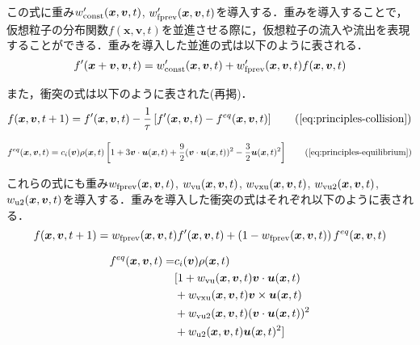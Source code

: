 この式に重み$w'_{\rm{const}}(\bm{x}, \bm{v}, t)$, $w'_{\rm{fprev}}(\bm{x}, \bm{v}, t)$を導入する．重みを導入することで，仮想粒子の分布関数$f(\bm{x}, \bm{v}, t)$を並進させる際に，仮想粒子の流入や流出を表現することができる．重みを導入した並進の式は以下のように表される．
\begin{equation}
  f'(\bm{x}+\bm{v}, \bm{v}, t) = 
  w'_{\rm{const}}(\bm{x}, \bm{v}, t) + 
  w'_{\rm{fprev}}(\bm{x}, \bm{v}, t) f(\bm{x}, \bm{v}, t) 
  \label{eq:weighted-streaming}
\end{equation}

また，衝突の式は以下のように表された(再掲)．
\begin{equation}
  f(\bm{x}, \bm{v}, t+1) = 
  f'(\bm{x}, \bm{v}, t) - 
  \frac{1}{\tau} \left[ 
    f'(\bm{x}, \bm{v}, t) - f^{eq}(\bm{x}, \bm{v}, t) 
  \right]
  \tag{\ref{eq:principles-collision}}
\end{equation}

\begin{equation}
  f^{eq}(\bm{x}, \bm{v}, t) = 
  c_i(\bm{v}) \rho(\bm{x}, t) \left[ 
    1 
    + 3\bm{v} \cdot \bm{u}(\bm{x}, t) 
    + \frac{9}{2}(\bm{v} \cdot \bm{u}(\bm{x}, t))^2 
    - \frac{3}{2}\bm{u}(\bm{x}, t)^2 
  \right]
  \tag{\ref{eq:principles-equilibrium}}
\end{equation}

これらの式にも重み$w_{\rm{fprev}}(\bm{x}, \bm{v}, t)$, $w_{\rm{vu}}(\bm{x}, \bm{v}, t)$, $w_{\rm{vxu}}(\bm{x}, \bm{v}, t)$, $w_{\rm{vu2}}(\bm{x}, \bm{v}, t)$, $w_{\rm{u2}}(\bm{x}, \bm{v}, t)$を導入する．重みを導入した衝突の式はそれぞれ以下のように表される．
\begin{equation}
  f(\bm{x}, \bm{v}, t+1) = 
  w_{\rm{fprev}}(\bm{x}, \bm{v}, t) f'(\bm{x}, \bm{v}, t) 
  + \left(1 - w_{\rm{fprev}}(\bm{x}, \bm{v}, t)\right) f^{eq}(\bm{x}, \bm{v}, t)
  \label{eq:principles-weighted-collision}
\end{equation}

\begin{equation}
\begin{split}
  f^{eq}(\bm{x}, \bm{v}, t) =
  &c_i(\bm{v}) \rho(\bm{x}, t) \\
  &[ 1 + w_{\rm{vu}}(\bm{x}, \bm{v}, t)\bm{v} \cdot \bm{u}(\bm{x}, t) \\
  &+ w_{\rm{vxu}}(\bm{x}, \bm{v}, t)\bm{v} \times \bm{u}(\bm{x}, t) \\
  &+ w_{\rm{vu2}}(\bm{x}, \bm{v}, t)(\bm{v} \cdot \bm{u}(\bm{x}, t))^2 \\
  &+ w_{\rm{u2}}(\bm{x}, \bm{v}, t)\bm{u}(\bm{x}, t)^2 ]
\end{split}
  \label{eq:principles-weighted-equilibrium}
\end{equation}

